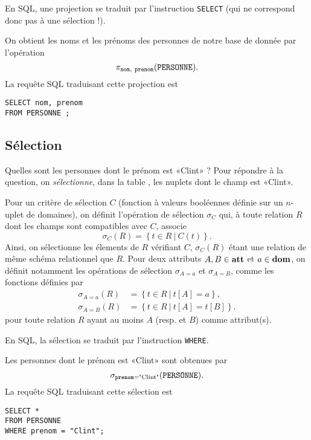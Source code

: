En SQL, une projection se traduit par l'instruction \texttt{SELECT} (qui ne correspond donc pas à une sélection !). 
\begin{exemple}
  On obtient les noms et les prénoms des personnes de notre base de donnée par l'opération 
  \begin{equation*}
    \pi_{\ttnom,\ \ttprenom}(\PERSONNE).
  \end{equation*}
  La requête SQL traduisant cette projection est 
\begin{verbatim}
SELECT nom, prenom
FROM PERSONNE ; 
\end{verbatim}

\end{exemple}
\subsection{Sélection}

Quelles sont les personnes dont le prénom est «Clint» ? Pour répondre à la question, on \emph{sélectionne}, dans la table
\PERSONNE{}, les nuplets dont le champ \ttprenom{} est «Clint».

\begin{defi}[Sélection]
  Pour un critère de sélection $C$ (fonction à valeurs booléennes définie sur un $n$-uplet de domaines), on définit l'opération de sélection $\sigma_{C}$ qui, à toute relation $R$ dont les champs sont compatibles avec $C$, associe
  \begin{equation*}
    \sigma_C(R) = \left\{t \in R~|~ C(t)\right\}.
  \end{equation*}
  Ainsi, on sélectionne les élements de $R$ vérifiant $C$, $\sigma_C(R)$ étant une relation de même schéma relationnel que $R$. 
  Pour deux attributs $A,B\in \mathbf{att}$ et $a\in \mathbf{dom}$, on définit notamment les opérations de 
  sélection $\sigma_{A=a}$ et $\sigma_{A=B}$, comme les fonctions définies
  par
  \begin{align*}
    \sigma_{A=a}(R)&=\left\{t\in R~|~t[A]=a\right\},\\
    \sigma_{A=B}(R)&=\left\{t\in R~|~t[A]=t[B]\right\}.
  \end{align*}
  pour toute relation $R$ ayant au moins $A$ (resp. et $B$) comme 
  attribut(s).
\end{defi}

En SQL, la sélection se traduit par l'instruction \texttt{WHERE}. 
\begin{exemple}
  Les personnes dont le prénom est «Clint» sont obtenues par 
  \begin{equation*}
    \sigma_{\mathtt{prenom} = \textrm{"Clint"}}(\mathtt{PERSONNE}).
  \end{equation*}
  La requête SQL traduisant cette sélection est 
\begin{verbatim}
SELECT * 
FROM PERSONNE 
WHERE prenom = "Clint";
\end{verbatim}
\end{exemple}

